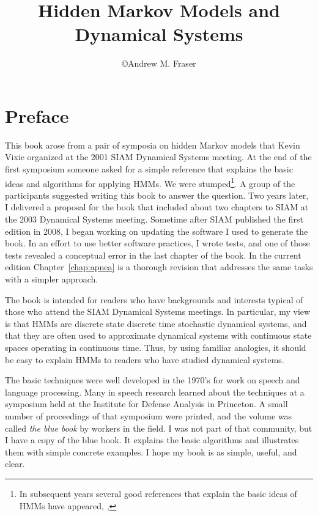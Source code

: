 \documentclass[ltxbook,showlabels, commentsvisible]{hmmdsbook}
\author{\copyright Andrew M. Fraser}
\title{Hidden Markov Models and Dynamical Systems}
\begin{document}
\frontmatter
\maketitle

\chapter*{Preface}
\label{chap:preface}
This book arose from a pair of symposia on hidden Markov models that
Kevin Vixie organized at the 2001 SIAM Dynamical Systems meeting.  At
the end of the first symposium someone asked for a simple reference
that explains the basic ideas and algorithms for applying HMMs.  We
were stumped\footnote{In subsequent years several good references that
  explain the basic ideas of HMMs have appeared, \eg, }.  A
group of the participants suggested writing this book to answer the
question.  Two years later, I delivered a proposal for the book that
included about two chapters to SIAM at the 2003 Dynamical Systems
meeting.  Sometime after SIAM published the first edition in 2008, I
began working on updating the software I used to generate the book.
In an effort to use better software practices, I wrote tests, and one
of those tests revealed a conceptual error in the last chapter of the
book.  In the current edition Chapter~\ref{chap:apnea} is a thorough
revision that addresses the same tasks with a simpler approach.

The book is intended for readers who have backgrounds and interests
typical of those who attend the SIAM Dynamical Systems meetings.  In
particular, my view is that HMMs are discrete state discrete time
stochastic dynamical systems, and that they are often used to
approximate dynamical systems with continuous state spaces operating
in continuous time.  Thus, by using familiar analogies, it should be
easy to explain HMMs to readers who have studied dynamical systems.

The basic techniques were well developed in the 1970's for work on
speech and language processing.  Many in speech research learned about
the techniques at a symposium held at the Institute for Defense
Analysis  in Princeton.  A small
number of proceedings of that symposium \cite{ida80} were printed, and
the volume was called \emph{the blue book} by workers in the field.  I
was not part of that community, but I have a copy of the blue book.
It explains the basic algorithms and illustrates them with simple
concrete examples.  I hope my book is as simple, useful, and clear.
\end{document}
